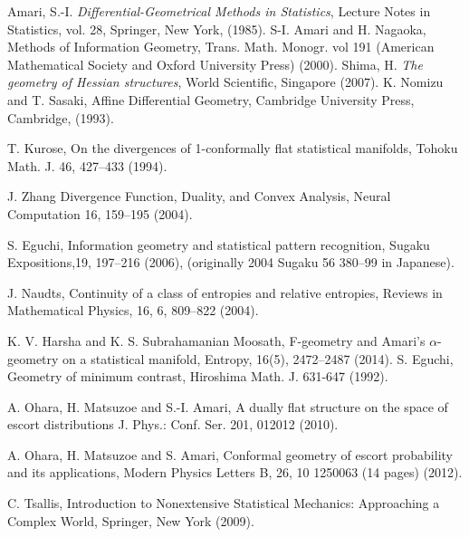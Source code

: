 \documentclass{llncs}
\begin{document}
\begin{thebibliography}{5}
%
	Amari, S.-I.
	{\it Differential-Geometrical Methods in Statistics}, 
	Lecture Notes in Statistics, vol. 28, Springer, New York, (1985).
S-I. Amari and H. Nagaoka,
Methods of Information Geometry,
Trans. Math. Monogr. vol 191
(American Mathematical Society and Oxford University Press) (2000).
	Shima, H.
	{\em The geometry of Hessian structures},
	World Scientific, Singapore (2007).
K. Nomizu and T. Sasaki,
Affine Differential Geometry, Cambridge University Press,
Cambridge, (1993).

T. Kurose, 
On the divergences of 1-conformally flat statistical manifolds,
Tohoku Math. J. 46, 427--433 (1994).

J. Zhang
Divergence Function, Duality, and Convex Analysis,
Neural Computation 16, 159--195 (2004).

S. Eguchi,
Information geometry and statistical pattern recognition,
Sugaku Expositions,19, 197--216 (2006),
(originally 2004 Sugaku 56 380--99 in Japanese).

J. Naudts, 
Continuity of a class of entropies and relative entropies,
Reviews in Mathematical Physics, 16, 6, 809--822 (2004).

K. V. Harsha and K. S. Subrahamanian Moosath, 
F-geometry and Amari's $\alpha$-geometry on a statistical manifold,
Entropy, 16(5), 2472--2487 (2014).
S. Eguchi,
Geometry of minimum contrast,
Hiroshima Math. J. 631-647 (1992).

A. Ohara, H. Matsuzoe and S.-I. Amari, 
A dually flat structure on the space of escort distributions
J. Phys.: Conf. Ser. 201, 012012 (2010).

A. Ohara, H. Matsuzoe and S. Amari,
Conformal geometry of escort probability and its applications,
Modern Physics Letters B, 26, 10 1250063 (14 pages) (2012).

C. Tsallis, 
Introduction to Nonextensive Statistical Mechanics: 
Approaching a Complex World, Springer, New York (2009).


\end{thebibliography}
\end{document}
